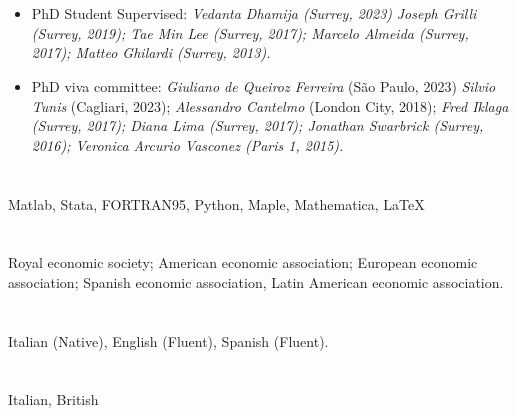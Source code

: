 \documentclass[margin, 11pt]{res} %
\begin{document}
\begin{resume}
\section{}
\begin{itemize}
\item PhD Student Supervised: \emph{Vedanta Dhamija (Surrey, 2023)} \emph{Joseph Grilli (Surrey, 2019); Tae Min Lee (Surrey, 2017); Marcelo Almeida (Surrey, 2017); Matteo Ghilardi (Surrey, 2013).}
\item PhD viva committee: \emph{Giuliano de Queiroz Ferreira} (S\~ao Paulo, 2023) \emph{Silvio Tunis} (Cagliari, 2023); \emph{Alessandro Cantelmo} (London City, 2018); \emph{Fred Iklaga (Surrey, 2017); Diana Lima (Surrey, 2017); Jonathan Swarbrick (Surrey, 2016); Veronica Arcurio Vasconez (Paris 1, 2015).}
\end{itemize}


\section{}
Matlab, Stata, FORTRAN95, Python, Maple, Mathematica, \LaTeX\\

 
\section{}
Royal economic society; American economic association; European economic association; Spanish economic association, Latin American economic association.

\section{}
Italian (Native), English (Fluent), Spanish (Fluent).

\section{}
Italian, British \\





\end{resume}
\end{document}
